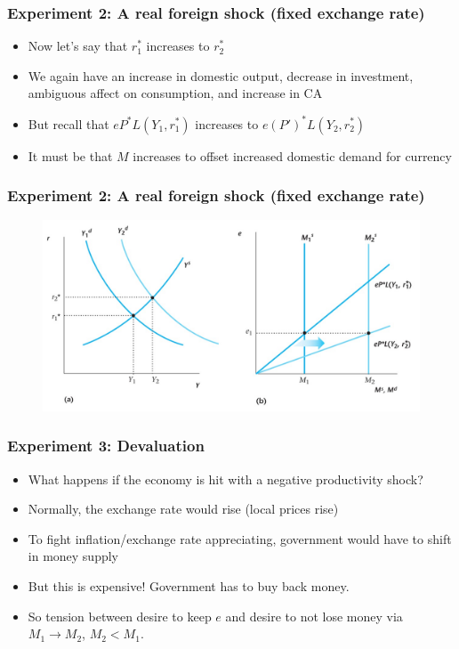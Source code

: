 \documentclass{beamer}
\begin{document}
\begin{frame}
\frametitle[alignment=center]{ Experiment 2:  A real foreign shock (fixed exchange rate)}
\begin{itemize}
\item Now let's say that $r_1^*$ increases to $r_2^*$
\bigskip
\item We again have an increase in domestic output, decrease in investment, ambiguous affect on consumption, and increase in CA
\bigskip
\item But recall that $eP^*L(Y_1,r_1^*)$ increases to $e(P')^*L(Y_2,r_2^*)$
\bigskip
\item It must be that $M$ increases to offset increased domestic demand for currency
\end{itemize}
\end{frame}


\begin{frame}
\frametitle[alignment=center]{Experiment 2:  A real foreign shock (fixed exchange rate)}
\begin{figure}
\centering
\includegraphics[scale=0.55]{Figures/W_Fig_17pt9.png}
\end{figure}
\end{frame}



\begin{frame}
\frametitle[alignment=center]{ Experiment 3:  Devaluation}
\begin{itemize}
\item What happens if the economy is hit with a negative productivity shock?
\bigskip
\item Normally, the exchange rate would rise (local prices rise)
\bigskip
\item To fight inflation/exchange rate appreciating, government would have to shift in money supply
\bigskip
\item But this is expensive!  Government has to buy back money.
\bigskip
\item So tension between desire to keep $e$ and desire to not lose money via $M_1\rightarrow M_2$, $M_2<M_1$.
\end{itemize}
\end{frame}
\end{document}
